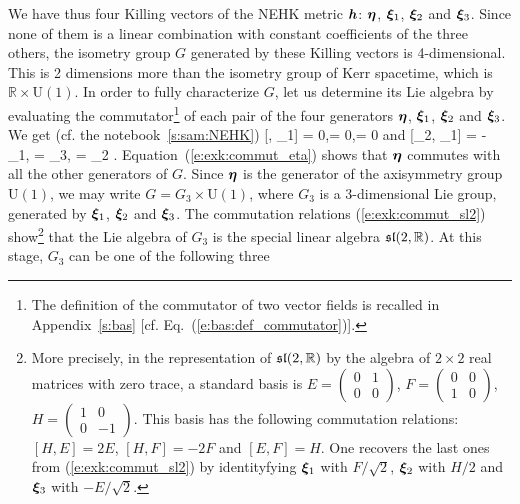 We have thus four Killing vectors of the NEHK metric $\bm{h}$:
$\bm{\eta}$, $\bm{\xi}_1$, $\bm{\xi}_2$ and  $\bm{\xi}_3$.
Since none of them is a linear combination with constant coefficients
of the three others, the isometry group $G$
generated by these Killing vectors is 4-dimensional. This is
2 dimensions more than
the isometry group of Kerr spacetime, which is $\mathbb{R}\times\mathrm{U}(1)$.
In order to fully characterize $G$,
let us determine its Lie algebra by evaluating
the commutator\footnote{The definition of the commutator
of two vector fields is recalled in Appendix~\ref{s:bas} [cf. Eq.~(\ref{e:bas:def_commutator})].} of each pair
of the four generators $\bm{\eta}$, $\bm{\xi}_1$, $\bm{\xi}_2$ and  $\bm{\xi}_3$.
We get (cf. the notebook~\ref{s:sam:NEHK})
\be \label{e:exk:commut_eta}
    [\w{\eta}, \w{\xi}_1] = 0,\quad
    [\w{\eta}, \w{\xi}_2] = 0,\quad
    [\w{\eta}, \w{\xi}_3] = 0
\ee
and
\be \label{e:exk:commut_sl2}
    [\w{\xi}_2, \w{\xi}_1] = - \w{\xi}_1, \quad
    [\w{\xi}_2, \w{\xi}_3] = \w{\xi}_3, \quad
    [\w{\xi}_1, \w{\xi}_3] = \w{\xi}_2 .
\ee
Equation~(\ref{e:exk:commut_eta}) shows that $\bm{\eta}$ commutes with all the
other generators of $G$. Since $\bm{\eta}$ is the
generator of the axisymmetry group $\mathrm{U}(1)$, we may write
$G = G_3\times \mathrm{U}(1)$, where $G_3$ is a
3-dimensional Lie group, generated by $\bm{\xi}_1$, $\bm{\xi}_2$ and
$\bm{\xi}_3$. The commutation relations (\ref{e:exk:commut_sl2})
show\footnote{More precisely, in the representation of
$\mathfrak{sl}(2,\mathbb{R})$ by the algebra of $2\times 2$ real matrices with zero
trace, a standard basis is
$E = \scriptscriptstyle \left( \begin{array}{cc}0 & 1\\[-1ex] 0 & 0 \end{array}\right)$,
$F = \scriptscriptstyle \left( \begin{array}{cc}0 & 0\\[-1ex] 1 & 0 \end{array}\right)$,
$H = \scriptscriptstyle \left( \begin{array}{cc}1 & 0\\[-1ex] 0 & -1 \end{array}\right)$.
This basis has the following commutation relations:
$[H, E] = 2E$, $[H, F] = - 2F$ and $[E,F] = H$. One recovers the last ones
from (\ref{e:exk:commut_sl2})
by identityfying $\bm{\xi}_1$ with $F/\sqrt{2}$, $\bm{\xi}_2$ with $H/2$
and  $\bm{\xi}_3$ with $-E/\sqrt{2}$.}
that the Lie algebra of $G_3$ is the special
linear algebra $\mathfrak{sl}(2,\mathbb{R})$.
At this stage, $G_3$ can be one of the following three
